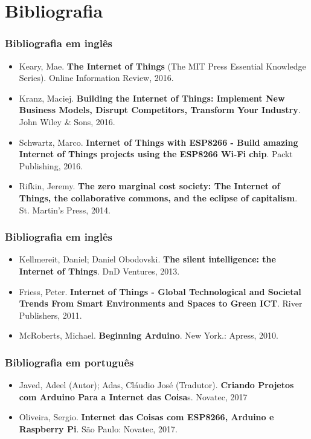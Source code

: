 \documentclass[t]{beamer}
\begin{document}
\section{Bibliografia}

\begin{frame}
\frametitle{Bibliografia em inglês}
\begin{itemize}
	\item Keary, Mae. \textbf{The Internet of Things} (The MIT Press Essential Knowledge Series). Online Information Review, 2016.

	\item Kranz, Maciej. \textbf{Building the Internet of Things: Implement New Business Models, Disrupt Competitors, Transform Your Industry}. John Wiley \& Sons, 2016.

	\item Schwartz, Marco. \textbf{Internet of Things with ESP8266 - Build amazing Internet of Things projects using the ESP8266 Wi-Fi chip}. Packt Publishing, 2016.

	\item Rifkin, Jeremy. \textbf{The zero marginal cost society: The Internet of Things, the collaborative commons, and the eclipse of capitalism}. St. Martin's Press, 2014.
\end{itemize}
\end{frame}

\begin{frame}
\frametitle{Bibliografia em inglês}
\begin{itemize}
\item Kellmereit, Daniel; Daniel Obodovski. \textbf{The silent intelligence: the Internet of Things}. DnD Ventures, 2013.

\item Friess, Peter. \textbf{Internet of Things - Global Technological and Societal Trends From Smart Environments and Spaces to Green ICT}. River Publishers, 2011.

\item McRoberts, Michael. \textbf{Beginning Arduino}. New York.: Apress, 2010.

\end{itemize}
\end{frame}

\begin{frame}
\frametitle{Bibliografia em português}
	\begin{itemize}
		\item Javed, Adeel (Autor); Adas, Cláudio José (Tradutor). \textbf{Criando Projetos com Arduino Para a Internet das Coisa}s. Novatec, 2017

		\item Oliveira, Sergio. \textbf{Internet das Coisas com ESP8266, Arduino e Raspberry Pi}. São Paulo: Novatec, 2017.
	\end{itemize}
\end{frame}
\end{document}
